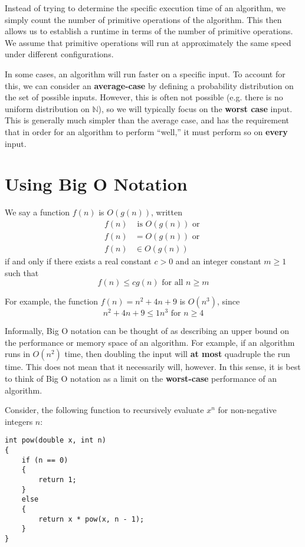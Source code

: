 \documentclass[a4paper]{article}
\begin{document}
Instead of trying to determine the specific execution time of an algorithm, we simply count the number of primitive operations of the algorithm. This then allows us to establish a runtime in terms of the number of primitive operations. We assume that primitive operations will run at approximately the same speed under different configurations. 

In some cases, an algorithm will run faster on a specific input. To account for this, we can consider an \textbf{average-case} by defining a probability distribution on the set of possible inputs. However, this is often not possible (e.g. there is no uniform distribution on $\mathbb{N}$), so we will typically focus on the \textbf{worst case} input. This is generally much simpler than the average case, and has the requirement that in order for an algorithm to perform ``well,'' it must perform so on \textbf{every} input. 

\section{Using Big O Notation}

We say a function $f(n)$ is $O(g(n))$, written \begin{align*}f(n) &\text{ is } O(g(n))\text{ or }\\f(n)&=O(g(n))\text{ or }\\f(n)&\in O(g(n))\end{align*} if and only if there exists a real constant $c>0$ and an integer constant $m\geq1$ such that \[f(n)\leq cg(n) \text{ for all }n\geq m\]

For example, the function $f(n)=n^2+4n+9$ is $O(n^3)$, since \[n^2+4n+9\leq 1n^3\text{ for } n\geq4\]

Informally, Big O notation can be thought of as describing an upper bound on the performance or memory space of an algorithm. For example, if an algorithm runs in $O(n^2)$ time, then doubling the input will \textbf{at most} quadruple the run time. This does not mean that it necessarily will, however. In this sense, it is best to think of Big O notation as a limit on the \textbf{worst-case} performance of an algorithm. 

Consider, the following function to recursively evaluate $x^n$ for non-negative integers $n$:
\begin{verbatim}
int pow(double x, int n)
{
	if (n == 0)
	{
		return 1;
	}
	else
	{
		return x * pow(x, n - 1);
	}
}
\end{verbatim}
\end{document}
